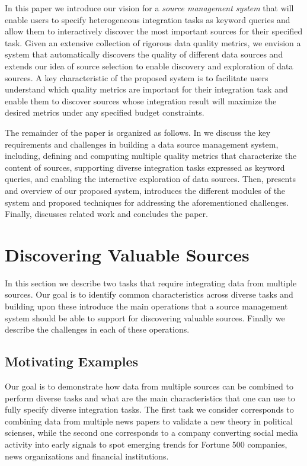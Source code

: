 \documentclass{sig-alternate}
\begin{document}
In this paper we introduce our vision for a {\em source management system} that will enable users to specify heterogeneous integration tasks as keyword queries and allow them to interactively discover the most important sources for their specified task. Given an extensive collection of rigorous data quality metrics, we envision a system that automatically discovers the quality of different data sources and extends our idea of source selection to enable discovery and exploration of data sources. A key characteristic of the proposed system is to facilitate users understand which quality metrics are important for their integration task and enable them to discover sources whose integration result will maximize the desired metrics under any specified budget constraints. 

The remainder of the paper is organized as follows. In  we discuss the key requirements and challenges in building a data source management system, including, defining and computing multiple quality metrics that characterize the content of sources, supporting diverse integration tasks expressed as keyword queries,  and enabling the interactive exploration of data sources. Then,  presents and overview of our proposed system, introduces the different modules of the system and proposed  techniques for addressing the aforementioned challenges. Finally,  discusses related work and  concludes the paper. 

\section{Discovering Valuable Sources}
\label{sec:discovery}
In this section we describe two tasks that require integrating data from multiple sources. Our goal is to identify common characteristics across diverse tasks and building upon these introduce the main operations that a source management system should be able to support for discovering valuable sources. Finally we describe the challenges in each of these operations.

\subsection{Motivating Examples}
\label{sec:example}
Our goal is to demonstrate how data from multiple sources can be combined to perform diverse tasks and what are the main characteristics that one can use to fully specify diverse integration tasks. The first task we consider corresponds to combining data from multiple news papers to validate a new theory in political scienses, while the second one corresponds to a company converting social media activity into early signals to spot emerging trends for Fortune 500 companies, news organizations and financial institutions. 
\end{document}
